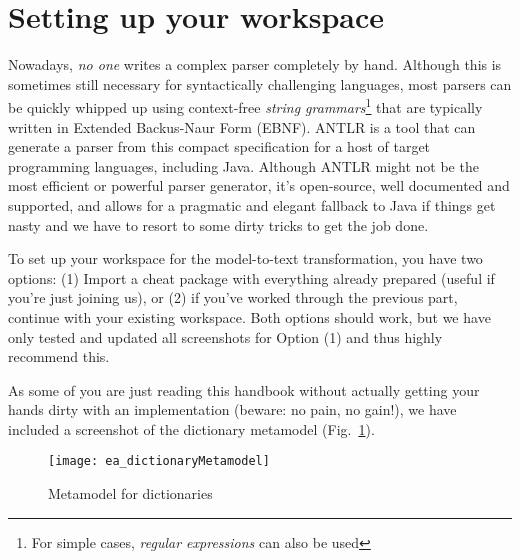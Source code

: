 \newpage
\section{Setting up your workspace}
\genHeader

Nowadays, \emph{no one} writes a complex parser completely by hand. Although this is sometimes still necessary for syntactically challenging languages, most
parsers can be quickly whipped up using context-free \emph{string grammars}\footnote{For simple cases, \emph{regular expressions} can also be used} that are
typically written in Extended Backus-Naur Form (EBNF). ANTLR is a tool that can generate a parser from this compact specification for
a host of target programming languages, including Java. Although ANTLR might not be the most efficient or powerful parser generator, it's open-source, well
documented and supported, and allows for a pragmatic and elegant fallback to Java if things get nasty and we have to resort to some dirty tricks to get the job
done.

To set up your workspace for the model-to-text transformation, you have two options: (1) Import a cheat package with everything already
prepared (useful if you're just joining us), or (2) if you've worked through the previous part, continue with your existing workspace. 
Both options should work, but we have only tested and updated all screenshots for Option (1) and thus highly recommend this.

As some of you are just reading this handbook without actually getting your hands dirty with an implementation (beware: no pain, no gain!), we have included a
screenshot of the dictionary metamodel (Fig.~\ref{ea:dictLang}).

\vspace{0.5cm}

\begin{figure}[htbp]
\begin{centering}
  \texttt{[image: ea\_dictionaryMetamodel]}
  \caption{Metamodel for dictionaries}
  \label{ea:dictLang}
  \end{centering}
\end{figure}

\vspace{0.5cm}

